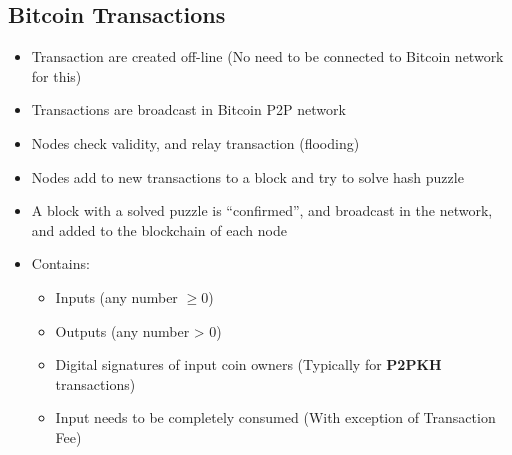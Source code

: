 \subsection{Bitcoin Transactions}
\begin{itemize}
	\item Transaction are created off-line (No need to be connected to Bitcoin network for this)
	\item Transactions are broadcast in Bitcoin P2P network
	\item Nodes check validity, and relay transaction (flooding)
	\item Nodes add to new transactions to a block and try to solve hash puzzle
	\item A block with a solved puzzle is ``confirmed'', and broadcast in the network, and added to the blockchain of each node
	\item Contains:
	\begin{itemize}
		\item Inputs (any number $\geq0$)
		\item Outputs (any number > 0)
		\item Digital signatures of input coin owners (Typically for \textbf{P2PKH} transactions)
		\item Input needs to be completely consumed (With exception of Transaction Fee)
	\end{itemize}
\end{itemize}
